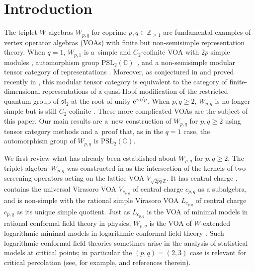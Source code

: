 \documentclass[pdftex]{sigma}
\numberwithin{equation}{section}
\theoremstyle{definition}
\begin{document}
\section{Introduction}

The triplet $W$-algebras $W_{p,q}$ for coprime $p,q\in\mathbb{Z}_{\geq 1}$ are fundamental examples of vertex operator algebras (VOAs) with finite but non-semisimple representation theory. When $q=1$, $W_{p,1}$ is a~simple and $C_2$-cofinite VOA with $2p$ simple modules \cite{AM-Wp1-alg}, automorphism group $\mathrm{PSL}_2(\mathbb{C})$~\cite{ALM}, and a non-semisimple modular tensor category of representations \cite{GaNe,TW1}. Moreover, as conjectured in \cite{FGST0} and proved recently in \cite{CLR, CLM,GaNe}, this modular tensor category is equivalent to the category of finite-dimensional representations of a quasi-Hopf modification of the restricted quantum group of $\mathfrak{sl}_2$ at the root of unity ${\rm e}^{\pi {\rm i}/p}$. When $p,q\geq 2$, $W_{p,q}$ is no longer simple but is still $C_2$-cofinite \cite{AM-W2p-alg, TW2}. These more complicated VOAs are the subject of this paper. Our main results are a~new construction of $W_{p,q}$ for $p,q\geq 2$ using tensor category methods and a~proof that, as in the $q=1$ case, the automorphism group of $W_{p,q}$ is $\mathrm{PSL}_2(\mathbb{C})$.

We first review what has already been established about $W_{p,q}$ for $p,q\geq 2$. The triplet algebra~$W_{p,q}$ was constructed in \cite{FGST1-Log} as the intersection of the kernels of two screening operators acting on the lattice VOA $V_{\sqrt{2pq}\mathbb{Z}}$. It has central charge , contains the universal Virasoro VOA $V_{c_{p,q}}$ of central charge $c_{p,q}$ as a subalgebra, and is non-simple with the rational simple Virasoro VOA $L_{c_{p,q}}$ of central charge $c_{p,q}$ as its unique simple quotient. Just as $L_{c_{p,q}}$ is the VOA of minimal models in rational conformal field theory in physics, $W_{p,q}$ is the VOA of $W$-extended logarithmic minimal models in logarithmic conformal field theory \cite{PR, Ras-W-ext, Ras-Fusion,RP1, GRW1, GRW2}. Such logarithmic conformal field theories sometimes arise in the analysis of statistical models at critical points; in particular the $(p,q)=(2,3)$ case is relevant for critical percolation (see, for example, \cite{CR} and references therein).
\end{document}
